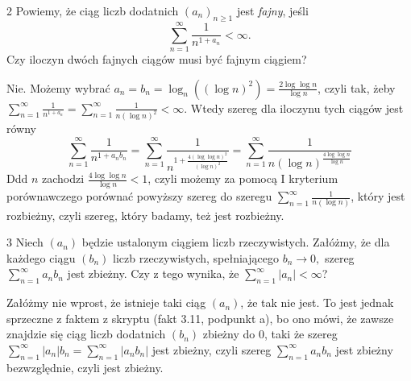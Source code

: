 \documentclass{../note}
\begin{document}
\begin{zadanie}{2}
Powiemy, że ciąg liczb dodatnich $(a_{n})_{n\ge1}$ jest \textit{fajny}, jeśli 
$$ \sum_{n=1}^{\infty}\frac{1}{n^{1+a_{n}}}<\infty. $$
Czy iloczyn dwóch fajnych ciągów musi być fajnym ciągiem?
\end{zadanie}
\begin{rozwiazanie}
Nie. Możemy wybrać $a_n=b_n=\log_n((\log n)^2)=\frac{2\log\log n}{\log n}$, czyli tak, żeby $\sum_{n=1}^{\infty}\frac{1}{n^{1+a_{n}}} = \sum_{n=1}^{\infty}\frac{1}{n(\log n)^2} < \infty$. Wtedy szereg dla iloczynu tych ciągów jest równy
\[\sum_{n=1}^{\infty} \frac{1}{n^{1+a_{n}b_n}} = \sum_{n=1}^{\infty} \frac{1}{n^{1+\frac{4(\log\log n)^2}{(\log n)^2}}} = \sum_{n=1}^{\infty} \frac{1}{n (\log n)^{\frac{4\log\log n}{\log n}}}\]
Ddd $n$ zachodzi $\frac{4\log\log n}{\log n} < 1$, czyli możemy za pomocą I kryterium porównawczego porównać powyższy szereg do szeregu $\sum_{n=1}^{\infty} \frac{1}{n (\log n)}$, który jest rozbieżny, czyli szereg, który badamy, też jest rozbieżny.
\end{rozwiazanie}

\begin{zadanie}{3}
Niech $(a_{n})$ będzie ustalonym ciągiem liczb rzeczywistych. Załóżmy, że dla każdego ciągu $(b_{n})$ liczb rzeczywistych, spełniającego $b_{n}\rightarrow0,$ szereg $\sum_{n=1}^{\infty}a_{n}b_{n}$ jest zbieżny. Czy z tego wynika, że $\sum_{n=1}^{\infty}|a_{n}|<\infty$?
\end{zadanie}
\begin{rozwiazanie}
Załóżmy nie wprost, że istnieje taki ciąg $(a_n)$, że tak nie jest. To jest jednak sprzeczne z faktem z skryptu (fakt 3.11, podpunkt a), bo ono mówi, że zawsze znajdzie się ciąg liczb dodatnich $(b_n)$ zbieżny do 0, taki że szereg $\sum_{n=1}^{\infty}|a_{n}|b_{n} = \sum_{n=1}^{\infty}|a_{n}b_{n}|$ jest zbieżny, czyli szereg $\sum_{n=1}^{\infty}a_{n}b_{n}$ jest zbieżny bezwzględnie, czyli jest zbieżny.
\end{rozwiazanie}
\end{document}
